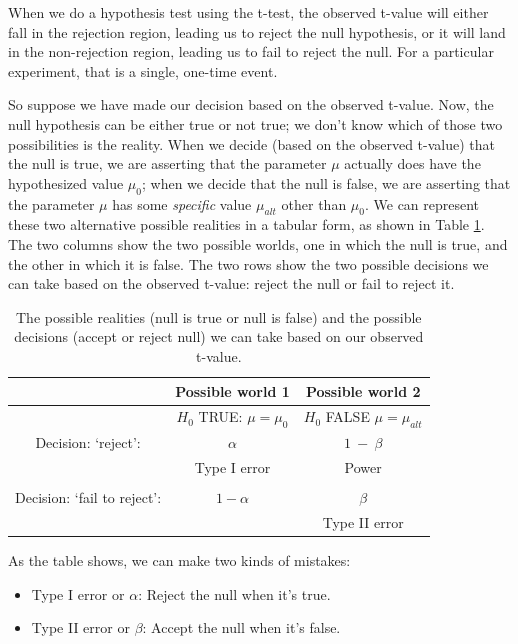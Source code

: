 \documentclass[
  12pt,
]{krantz}
\providecommand{\tightlist}{%
  \setlength{\itemsep}{0pt}\setlength{\parskip}{0pt}}
\theoremstyle{definition}
\theoremstyle{definition}
\theoremstyle{definition}
\theoremstyle{definition}
\theoremstyle{remark}
\begin{document}
When we do a hypothesis test using the t-test, the observed t-value will either fall in the rejection region, leading us to reject the null hypothesis,
or it will land in the non-rejection region, leading us to fail to reject the null. For a particular experiment, that is a single, one-time event.

So suppose we have made our decision based on the observed t-value. Now, the null hypothesis can be either true or not true; we don't know which of those two possibilities is the reality.
When we decide (based on the observed t-value) that the null is true, we are asserting that the parameter \(\mu\) actually does have the hypothesized value \(\mu_0\); when we decide that the null is false, we are asserting that the parameter \(\mu\) has some \emph{specific} value \(\mu_{alt}\) other than \(\mu_0\).
We can represent these two alternative possible realities in a tabular form, as shown in Table \ref{tab:type12}. The two columns show the two possible worlds, one in which the null is true, and the other in which it is false. The two rows show the two possible decisions we can take based on the observed t-value: reject the null or fail to reject it.

\begin{table}
\begin{tabular}{ccc}
        & \textbf{Possible world 1}      & \textbf{Possible world 2} \\  
\hline
 & $H_0$ TRUE: $\mu=\mu_0$  & $H_0$ FALSE $\mu=\mu_{alt}$ \\
\hline
Decision: `reject': & $\alpha$ & $1~-~\beta$ \\
                                     & Type I error                         & Power \\                                      
                                     & & \\
\hline
Decision: `fail to reject': & $1 - \alpha$ & $\beta$ \\                                    &                                 & Type II error\\
\hline
\end{tabular}
\caption{The possible realities (null is true or null is false) and the possible decisions (accept or reject null) we can take based on our observed t-value.} \label{tab:type12}
\end{table}

As the table shows, we can make two kinds of mistakes:

\begin{itemize}
\tightlist
\item
  Type I error or \(\alpha\): Reject the null when it's true.
\item
  Type II error or \(\beta\): Accept the null when it's false.
\end{itemize}
\end{document}
